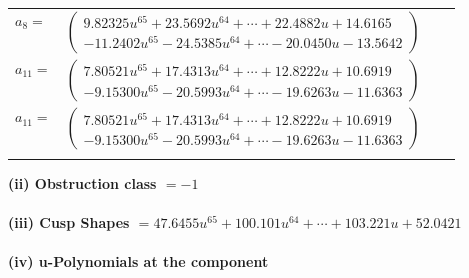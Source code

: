 \documentclass[1p]{elsarticle_modified}
\theoremstyle{definition}
\begin{document}
\begin{tabular}{m{7pt} m{180pt} m{7pt} m{180pt} }
\flushright $a_{8}=$&$\begin{pmatrix}9.82325 u^{65}+23.5692 u^{64}+\cdots+22.4882 u+14.6165\\-11.2402 u^{65}-24.5385 u^{64}+\cdots-20.0450 u-13.5642\end{pmatrix}$ \\
\flushright $a_{11}=$&$\begin{pmatrix}7.80521 u^{65}+17.4313 u^{64}+\cdots+12.8222 u+10.6919\\-9.15300 u^{65}-20.5993 u^{64}+\cdots-19.6263 u-11.6363\end{pmatrix}$\\ \flushright $a_{11}=$&$\begin{pmatrix}7.80521 u^{65}+17.4313 u^{64}+\cdots+12.8222 u+10.6919\\-9.15300 u^{65}-20.5993 u^{64}+\cdots-19.6263 u-11.6363\end{pmatrix}$\\&\end{tabular}
\flushleft \textbf{(ii) Obstruction class $= -1$}\\~\\
\flushleft \textbf{(iii) Cusp Shapes $= 47.6455 u^{65}+100.101 u^{64}+\cdots+103.221 u+52.0421$}\\~\\
\newpage\renewcommand{\arraystretch}{1}
\flushleft \textbf{(iv) u-Polynomials at the component}\newline \\
\end{document}
